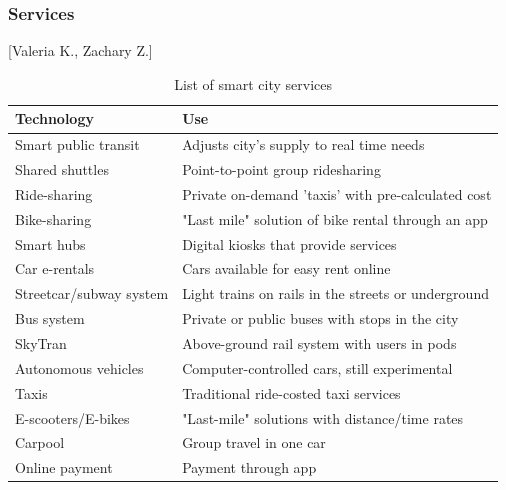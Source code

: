 \documentclass[12pt]{article}                               %
\begin{document}
\subsubsection{Services}[Valeria K., Zachary Z.] \label{sec:smart_city_services}
\begin{table}[H]
    \centering
    \small
    \begin{tabular}{l|l}
        \textbf{Technology} & \textbf{Use} \\
        \hline{}
        
        Smart public transit &
        Adjusts city's supply to real time needs \\
        \hline{}
        
        Shared shuttles &
        Point-to-point group ridesharing \\
        \hline{}
        
        Ride-sharing &
        Private on-demand 'taxis' with pre-calculated cost \\
        \hline{}
        
        Bike-sharing &
        "Last mile" solution of bike rental through an app \\
        \hline{}
        
        Smart hubs &
        Digital kiosks that provide services \\
        \hline{}
        
        Car e-rentals &
        Cars available for easy rent online \\
        \hline{}
        
        Streetcar/subway system &
        Light trains on rails in the streets or underground \\
        \hline{}
        
        Bus system &
        Private or public buses with stops in the city \\
        \hline{}
        
        SkyTran &
        Above-ground rail system with users in pods \\
        \hline{}
        
        Autonomous vehicles &
        Computer-controlled cars, still experimental \\
        \hline{}
        
        Taxis &
        Traditional ride-costed taxi services \\
        \hline{}
        
        E-scooters/E-bikes &
        "Last-mile" solutions with distance/time rates \\
        \hline{}
        
        Carpool &
        Group travel in one car \\
        \hline{}
        
        Online payment &
        Payment through app
    \end{tabular}
    \caption{List of smart city services}
    \label{tab:smart_city_services}
\end{table}
\end{document}
